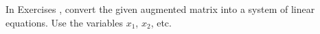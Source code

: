 {In Exercises}
{, convert the given augmented matrix into a system of linear equations. Use the variables $x_1$, $x_2$, etc.}
